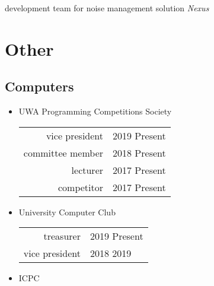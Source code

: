 \documentclass[a4paper]{style}
\begin{document}
\begin{minipage}[t]{0.54\textwidth}
\vspace{-1pt}
\begin{tightitemize}
\item development team for noise management solution \textit{Nexus}
\end{tightitemize}

\sectionspace{}


\section{Other}
\subsection{Computers}
\vspace{5pt}
\begin{itemize}
\item UWA Programming Competitions Society
\begin{tabular}{r|l}
	vice president & 2019 \textendash{} Present \\
	committee member & 2018 \textendash{} Present \\
	lecturer & 2017 \textendash{} Present \\
	competitor & 2017 \textendash{} Present
\end{tabular}
\item University Computer Club \\
\begin{tabular}{r|l}
	\hspace{20pt} treasurer & 2019 \textendash{} Present \\
	\hspace{22pt} vice president & 2018 \textendash{} 2019
\end{tabular}
\item ICPC
\end{itemize}

\end{minipage}
\end{document}
